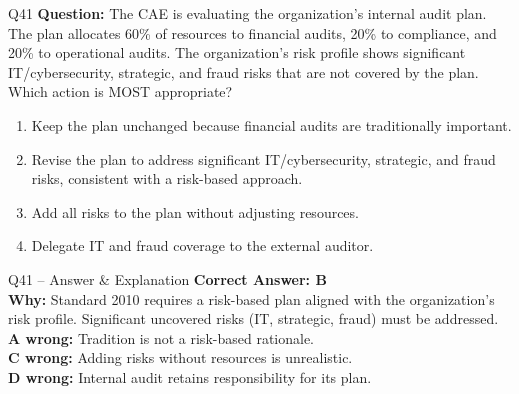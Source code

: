 \documentclass[aspectratio=169,10pt]{beamer}
\begin{document}
	\begin{frame}[t]{Q41}
		\small
		\textbf{Question:} The CAE is evaluating the organization's internal audit plan. The plan allocates 60\% of resources to financial audits, 20\% to compliance, and 20\% to operational audits. The organization's risk profile shows significant IT/cybersecurity, strategic, and fraud risks that are not covered by the plan. Which action is MOST appropriate?
		\begin{enumerate}[label=\Alph*.,itemsep=1pt,topsep=2pt]
			\item Keep the plan unchanged because financial audits are traditionally important.
			\item Revise the plan to address significant IT/cybersecurity, strategic, and fraud risks, consistent with a risk-based approach.
			\item Add all risks to the plan without adjusting resources.
			\item Delegate IT and fraud coverage to the external auditor.
		\end{enumerate}
	\end{frame}
	
	\begin{frame}[t]{Q41 -- Answer \& Explanation}
		\small
		\textbf{Correct Answer: B} \\[4pt]
		\textbf{Why:} Standard 2010 requires a risk-based plan aligned with the organization's risk profile. Significant uncovered risks (IT, strategic, fraud) must be addressed. \\[4pt]
		\textbf{A wrong:} Tradition is not a risk-based rationale. \\[2pt]
		\textbf{C wrong:} Adding risks without resources is unrealistic. \\[2pt]
		\textbf{D wrong:} Internal audit retains responsibility for its plan.
	\end{frame}
	
\end{document}
